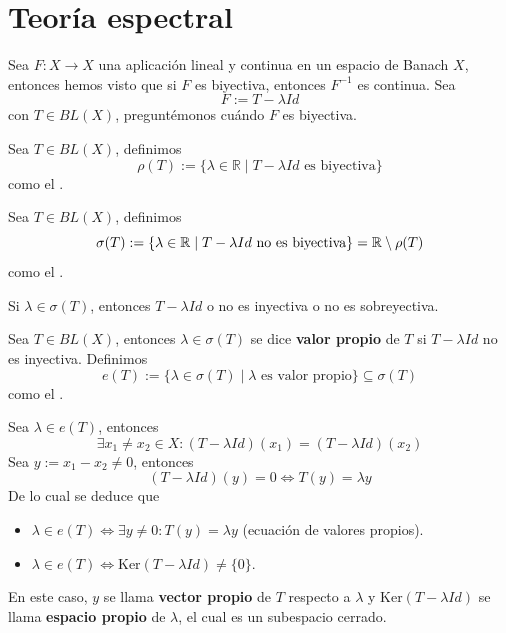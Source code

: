 \chapter{Teoría espectral}


\noindent 
Sea $F: X \to X$ una aplicación lineal y continua en un espacio de Banach $X$, entonces hemos visto que si $F$ es biyectiva, entonces $F^{-1}$ es continua. Sea 
$$F := T - \lambda Id$$
con $T \in BL(X)$, preguntémonos cuándo $F$ es biyectiva. \\

\begin{definicion}[Resolvente]
    Sea $T \in BL(X)$, definimos 
    $$\rho(T) := \{ \lambda \in \mathbb{R} \mid T - \lambda Id \text{ es biyectiva} \}$$
    como el .
\end{definicion}
\begin{definicion}[Espectro]
    Sea $T \in BL(X)$, definimos 
    $$\sigma(T) := \{ \lambda \in \mathbb{R} \mid T - \lambda Id \text{ no es biyectiva} \}=\mathbb{R}\setminus \rho(T)$$ 
    como el . \\
\end{definicion}


\begin{observacion}
    Si $\lambda \in \sigma(T)$, entonces $T - \lambda Id$ o no es inyectiva o no es sobreyectiva.
\end{observacion}


\begin{definicion}
    Sea $T\in BL(X)$, entonces $\lambda \in \sigma(T)$ se dice \textbf{valor propio} de $T$ si $T - \lambda Id$ no es inyectiva. Definimos 
    $$e(T) := \{ \lambda \in \sigma(T) \mid \lambda \text{ es valor propio} \} \subseteq \sigma(T)$$
    como el .
\end{definicion}

\begin{observacion}
    Sea $\lambda \in e(T)$, entonces 
    $$\exists x_1 \neq x_2 \in X : (T - \lambda Id)(x_1) = (T - \lambda Id)(x_2)$$
    Sea $y:=x_1-x_2\neq 0$, entonces
    \begin{equation*}
        (T - \lambda Id)(y) = 0 \iff T(y) = \lambda y
    \end{equation*}
    De lo cual se deduce que 
    \begin{itemize}
        \item $\lambda \in e(T) \iff \exists y \neq 0 : T(y) = \lambda y$ (ecuación de valores propios).
        \item $\lambda \in e(T) \iff \text{Ker}(T - \lambda Id) \neq \{0\}$.
    \end{itemize}
    En este caso, $y$ se llama \textbf{vector propio} de $T$ respecto a $\lambda$ y $\text{Ker}(T - \lambda Id)$ se llama \textbf{espacio propio} de $\lambda$, el cual es un subespacio cerrado.
\end{observacion}




